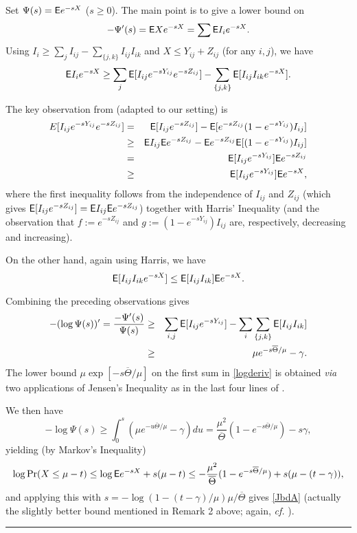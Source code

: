 \documentclass[letterpaper,11pt]{article}
\newcommand{\ov}[0]{\overline}
\newcommand{\0}[0]{\emptyset}
\renewcommand{\qed}[0]{\begin{flushright} \rule{2mm}{3mm} \end{flushright}}
\newcommand{\gc}[0]{\gamma }
\begin{document}
Set $\Psi(s) = {\sf E} e^{-sX}$ ($s\geq 0$).  The main point
is to give a lower bound on
\[
-\Psi'(s) ={\sf E} Xe^{-sX} = \sum{\sf E} I_ie^{-sX}.
\]
Using $I_i\geq \sum_j I_{ij} - \sum_{\{j,k\}}I_{ij}I_{ik}$
and $X\leq Y_{ij}+Z_{ij}$ (for any $i,j$), we have
\[
{\sf E} I_ie^{-sX}
\geq \sum_j {\sf E} [I_{ij}e^{-sY_{ij}}e^{-sZ_{ij}} ]
 - \sum_{\{j,k\}}{\sf E} [I_{ij}I_{ik}e^{-sX}].
\]

The key observation from \cite{RW}
(adapted to our setting) is
\begin{eqnarray}
E [I_{ij}e^{-sY_{ij}}e^{-sZ_{ij}} ]
&=&
{\sf E} [I_{ij}e^{-sZ_{ij}}] -
{\sf E} [e^{-sZ_{ij}}(1-e^{-sY_{ij}})I_{ij}]\nonumber\\
&\geq &
{\sf E} I_{ij}{\sf E} e^{-sZ_{ij}} -
{\sf E} e^{-sZ_{ij}}{\sf E}[(1-e^{-sY_{ij}})I_{ij}]\nonumber\\
&=&
{\sf E} [I_{ij}e^{-sY_{ij}}]{\sf E} e^{-sZ_{ij}}\nonumber\\
&\geq &
{\sf E} [I_{ij}e^{-sY_{ij}}]{\sf E} e^{-sX},
\label{RWobs}
\end{eqnarray}
where the first inequality follows from the independence
of $I_{ij}$ and $Z_{ij}$
(which gives
${\sf E} [I_{ij}e^{-sZ_{ij}}]={\sf E} I_{ij}{\sf E} e^{-sZ_{ij}}$)
together with
Harris' Inequality (and the observation that
$f:= e^{-sZ_{ij}}$ and $g:=(1-e^{-sY_{ij}})I_{ij}$ are, respectively,
decreasing and increasing).

On the other hand, again using Harris, we have
\[{\sf E} [I_{ij}I_{ik}e^{-sX}]\leq
{\sf E} [I_{ij}I_{ik}]{\sf E} e^{-sX}.\]


Combining the preceding observations gives
\begin{eqnarray}
-(\log \Psi(s))' =\frac{-\Psi'(s)}{\Psi(s)}
&\geq &
\sum_{i,j}\E [I_{ij}e^{-sY_{ij}}]
- \sum_i\sum_{\{j,k\}}\E [I_{ij}I_{ik}]\label{logderiv} \\
&\geq &\mu e^{-s\ov{\Theta}/\mu} -\gc.\nonumber
\end{eqnarray}
The lower bound $\mu\exp[-s\ov{\Theta}/\mu]$
on the first sum in \eqref{logderiv}
is obtained {\em via}
two applications of Jensen's Inequality as
in the last four lines of \cite[p. 32]{JLR}.

We then have
\[
-\log\Psi(s) \geq \int_0^s(\mu e^{-u\ov{\Theta}/\mu}-\gc)du
= \frac{\mu^2}{\ov{\Theta}}(1-e^{-s\ov{\Theta}/\mu}) -s\gc,
\]
yielding (by Markov's Inequality)
\[
\log\Pr(X\leq \mu-t)\leq \log \E e^{-sX} +s(\mu-t)
\leq
-\frac{\mu^2}{\ov{\Theta}}(1-e^{-s\ov{\Theta}/\mu}) +s(\mu-(t-\gc)),
\]
and applying this with
$s=-\log (1-(t-\gc)/\mu)\mu/\ov{\Theta}$ gives
\eqref{JbdA} (actually the slightly better bound mentioned in Remark 2
above; again, {\em cf.} \cite[p. 33]{JLR}).\qed
\end{document}
